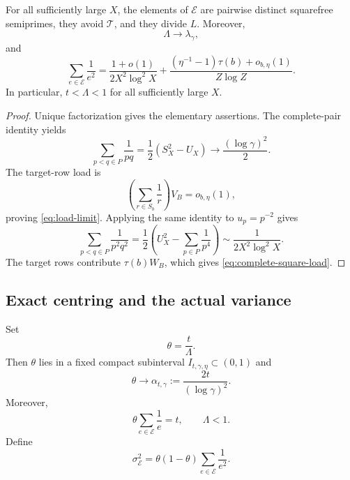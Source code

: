 \begin{proposition}
\label{prop:arithmetic-capacity}
For all sufficiently large $X$, the elements of $\mathcal E$ are pairwise distinct squarefree semiprimes, they avoid $\mathcal T$, and they divide $L$. Moreover,
\begin{equation}
\label{eq:load-limit}
 \Lambda\longrightarrow\lambda_\gamma,
\end{equation}
and
\begin{equation}
\label{eq:complete-square-load}
 \sum_{e\in\mathcal E}\frac1{e^2}
 =\frac{1+o(1)}{2X^2\log^2X}
 +\frac{(\eta^{-1}-1)\tau(b)+o_{b,\eta}(1)}{Z\log Z}.
\end{equation}
In particular, $t<\Lambda<1$ for all sufficiently large $X$.
\end{proposition}
\begin{proof}
Unique factorization gives the elementary assertions. The complete-pair identity yields
\[
 \sum_{p<q\in P}\frac1{pq}=\frac12(S_X^2-U_X)\longrightarrow\frac{(\log\gamma)^2}{2}.
\]
The target-row load is
\[
 \left(\sum_{r\in S_b}\frac1r\right)V_B=o_{b,\eta}(1),
\]
proving \cref{eq:load-limit}. Applying the same identity to $u_p=p^{-2}$ gives
\[
 \sum_{p<q\in P}\frac1{p^2q^2}
 =\frac12\left(U_X^2-\sum_{p\in P}\frac1{p^4}\right)
 \sim\frac1{2X^2\log^2X}.
\]
The target rows contribute $\tau(b)W_B$, which gives \cref{eq:complete-square-load}.
\end{proof}

\subsection{Exact centring and the actual variance}

Set
\begin{equation}
\label{eq:theta-definition}
 \theta=\frac{t}{\Lambda}.
\end{equation}
Then $\theta$ lies in a fixed compact subinterval $I_{t,\gamma,\eta}\subset(0,1)$ and
\begin{equation}
\label{eq:theta-limit}
 \theta\longrightarrow\alpha_{t,\gamma}:=\frac{2t}{(\log\gamma)^2}.
\end{equation}
Moreover,
\begin{equation}
\label{eq:exact-centering-load}
 \theta\sum_{e\in\mathcal E}\frac1e=t,
 \qquad \Lambda<1.
\end{equation}
Define
\begin{equation}
\label{eq:sigma-E}
 \sigma_{\mathcal E}^2=\theta(1-\theta)\sum_{e\in\mathcal E}\frac1{e^2}.
\end{equation}


